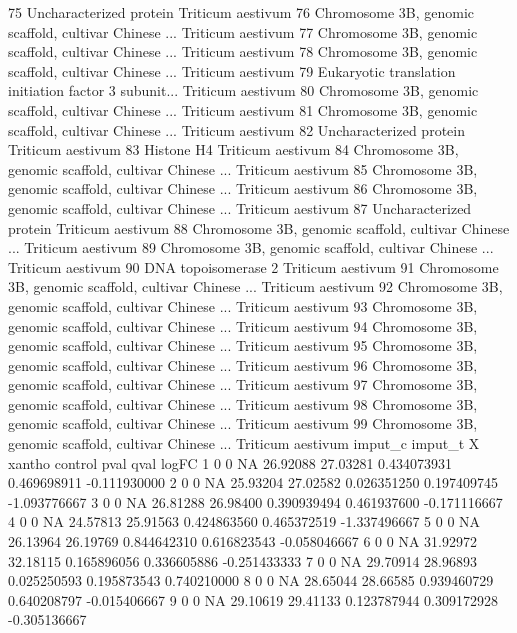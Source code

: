 \documentclass{beamer}
\begin{document}
\begin{frame}[fragile]
\begin{itemize}
\begin{Schunk}
\begin{Soutput}
75                                Uncharacterized protein Triticum aestivum
76 Chromosome 3B, genomic scaffold, cultivar Chinese ...  Triticum aestivum
77 Chromosome 3B, genomic scaffold, cultivar Chinese ...  Triticum aestivum
78 Chromosome 3B, genomic scaffold, cultivar Chinese ...  Triticum aestivum
79 Eukaryotic translation initiation factor 3 subunit...  Triticum aestivum
80 Chromosome 3B, genomic scaffold, cultivar Chinese ...  Triticum aestivum
81 Chromosome 3B, genomic scaffold, cultivar Chinese ...  Triticum aestivum
82                                Uncharacterized protein Triticum aestivum
83                                             Histone H4 Triticum aestivum
84 Chromosome 3B, genomic scaffold, cultivar Chinese ...  Triticum aestivum
85 Chromosome 3B, genomic scaffold, cultivar Chinese ...  Triticum aestivum
86 Chromosome 3B, genomic scaffold, cultivar Chinese ...  Triticum aestivum
87                                Uncharacterized protein Triticum aestivum
88 Chromosome 3B, genomic scaffold, cultivar Chinese ...  Triticum aestivum
89 Chromosome 3B, genomic scaffold, cultivar Chinese ...  Triticum aestivum
90                                    DNA topoisomerase 2 Triticum aestivum
91 Chromosome 3B, genomic scaffold, cultivar Chinese ...  Triticum aestivum
92 Chromosome 3B, genomic scaffold, cultivar Chinese ...  Triticum aestivum
93 Chromosome 3B, genomic scaffold, cultivar Chinese ...  Triticum aestivum
94 Chromosome 3B, genomic scaffold, cultivar Chinese ...  Triticum aestivum
95 Chromosome 3B, genomic scaffold, cultivar Chinese ...  Triticum aestivum
96 Chromosome 3B, genomic scaffold, cultivar Chinese ...  Triticum aestivum
97 Chromosome 3B, genomic scaffold, cultivar Chinese ...  Triticum aestivum
98 Chromosome 3B, genomic scaffold, cultivar Chinese ...  Triticum aestivum
99 Chromosome 3B, genomic scaffold, cultivar Chinese ...  Triticum aestivum
   imput_c imput_t  X   xantho  control        pval        qval        logFC
1        0       0 NA 26.92088 27.03281 0.434073931 0.469698911 -0.111930000
2        0       0 NA 25.93204 27.02582 0.026351250 0.197409745 -1.093776667
3        0       0 NA 26.81288 26.98400 0.390939494 0.461937600 -0.171116667
4        0       0 NA 24.57813 25.91563 0.424863560 0.465372519 -1.337496667
5        0       0 NA 26.13964 26.19769 0.844642310 0.616823543 -0.058046667
6        0       0 NA 31.92972 32.18115 0.165896056 0.336605886 -0.251433333
7        0       0 NA 29.70914 28.96893 0.025250593 0.195873543  0.740210000
8        0       0 NA 28.65044 28.66585 0.939460729 0.640208797 -0.015406667
9        0       0 NA 29.10619 29.41133 0.123787944 0.309172928 -0.305136667

\end{Soutput}
\end{Schunk}
\end{itemize}
\end{frame}
\end{document}
